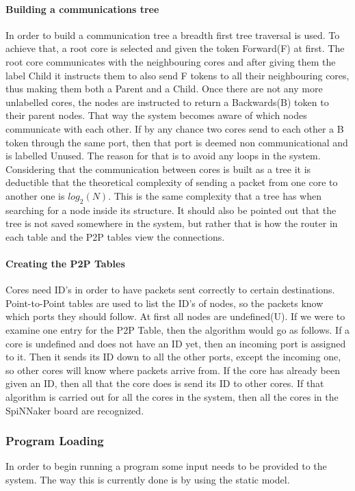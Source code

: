 \documentclass[12pt,a4paper]{article}
\begin{document}
\paragraph{Building a communications tree}
In order to build a communication tree a breadth first tree traversal is used. To achieve that, a root core is selected and given the token Forward(F) at first. The root core communicates with the neighbouring cores and after giving them the label Child it instructs them to also send F tokens to all their neighbouring cores, thus making them both a Parent and a Child. Once there are not any more unlabelled cores, the nodes are instructed to return a Backwards(B) token to their parent nodes. That way the system becomes aware of which nodes communicate with each other. If by any chance two cores send to each other a B token through the same port, then that port is deemed non communicational and is labelled Unused. The reason for that is to avoid any loops in the system\cite{jefflec}. Considering that the communication between cores is built as a tree it is deductible that the theoretical complexity of sending a packet from one core to another one is $log_2(N)$. This is the same complexity that a tree has when searching for a node inside its structure. It should also be pointed out that the tree is not saved somewhere in the system, but rather that is how the router in each table and the P2P tables view the connections.
\paragraph{Creating the P2P Tables}
Cores need ID's in order to have packets sent correctly to certain destinations. Point-to-Point tables are used to list the ID's of nodes, so the packets know which ports they should follow. At first all nodes are undefined(U). If we were to examine one entry for the P2P Table, then the algorithm would go as follows. If a core is undefined and does not have an ID yet, then an incoming port is assigned to it. Then it sends its ID down to all the other ports, except the incoming one, so other cores will know where packets arrive from. If the core has already been given an ID, then all that the core does is send its ID to other cores. If that algorithm is carried out for all the cores in the system, then all the cores in the SpiNNaker board are recognized\cite{jefflec}.

\subsubsection{Program Loading}
In order to begin running a program some input needs to be provided to the system. The way this is currently done is by using the static model. 
\end{document}
